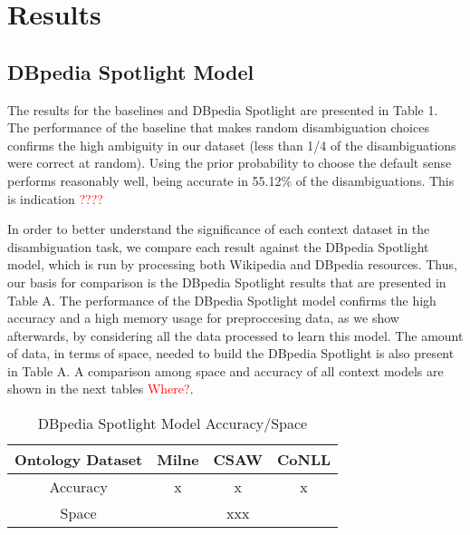 \documentclass[10pt,a4paper]{article}
\begin{document}

\section{Results}

\subsection{DBpedia Spotlight Model}

The results for the baselines and DBpedia Spotlight are presented in Table 1. The performance of the baseline that makes random disambiguation choices confirms the high ambiguity in our dataset (less than 1/4 of the disambiguations were correct at random). Using the prior probability to choose the default sense performs reasonably well, being accurate in 55.12\% of the disambiguations. This is indication \textcolor{red}{????}

In order to better understand the significance of each context dataset in the disambiguation task, we compare each result against the DBpedia Spotlight model, which is run by processing both Wikipedia and DBpedia resources. Thus, our basis for comparison is the DBpedia Spotlight results that are presented in Table A. The performance of the DBpedia Spotlight model confirms the high accuracy and a high memory usage for preproccesing data, as we show afterwards, by considering all the data processed to learn this model. The amount of data, in terms of space, needed to build the DBpedia Spotlight is also present in Table A. A comparison among space and accuracy of all context models are shown in the next tables \textcolor{red}{Where?}.

\begin{table}[ht] 
\caption{DBpedia Spotlight Model Accuracy/Space}
\centering
\begin{tabular}{c c c c}
\hline\hline 
Ontology Dataset	& Milne 	& CSAW 	& CoNLL \\ [0.5ex] 
\hline 
Accuracy 			& x			& x 	& x 	\\ 
Space 				& 	 		& xxx 	& 	 	\\ [1ex] 
\hline
\end{tabular} 
\label{table:nonlin} 
\end{table} 
\end{document}
